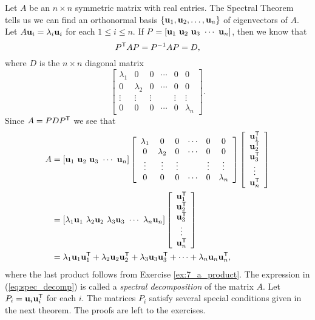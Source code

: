 \label{sec:spec_decomp_symm_mtx}

Let $A$ be an $n \times n$ symmetric matrix with real entries. The Spectral Theorem tells us we can find an orthonormal basis $\{\mathbf{u}_1, \mathbf{u}_2, \ldots, \mathbf{u}_n\}$ of eigenvectors of $A$. Let $A \mathbf{u}_i = \lambda_i \mathbf{u}_i$ for each $1 \leq i \leq n$. If $P = [ \vu_1 \  \vu_2 \  \vu_3 \  \cdots \ \vu_n]$, then we know that
\[P^{\mathsf{T}}AP = P^{-1}AP = D,\]
where $D$ is the $n \times n$ diagonal matrix
\[\left[ \begin{array}{cccccc} \lambda_1&0&0&\cdots&0&0 \\ 0&\lambda_2&0&\cdots&0&0 \\ \vdots&\vdots&\vdots&&\vdots&\vdots \\ 0&0&0&\cdots&0&\lambda_n \end{array} \right].\]
Since $A = PDP^{\mathsf{T}}$ we see that
\begin{align}
A &= [ \vu_1 \ \vu_2 \ \vu_3 \ \cdots \ \vu_n] \left[ \begin{array}{cccccc} \lambda_1&0&0&\cdots&0&0 \\ 0&\lambda_2&0&\cdots&0&0 \\ \vdots&\vdots&\vdots&&\vdots&\vdots \\ 0&0&0&\cdots&0&\lambda_n \end{array} \right] \left[ \begin{array}{c} \vu_1^{\tr} \\ \vu_2^{\tr} \\ \vu_3^{\tr} \\ \vdots \\ \vu_n^{\tr} \end{array} \right] \notag \\
	&= [ \lambda_1\vu_1 \ \lambda_2\vu_2 \ \lambda_3\vu_3 \ \cdots \ \lambda_n\vu_n] \left[ \begin{array}{c} \vu_1^{\tr} \\ \vu_2^{\tr} \\ \vu_3^{\tr} \\ \vdots \\ \vu_n^{\tr} \end{array} \right] \notag \\
	&= \lambda_1 \vu_1\vu_1^{\tr} + \lambda_2 \vu_2\vu_2^{\tr} + \lambda_3 \vu_3\vu_3^{\tr} + \cdots + \lambda_n \vu_n\vu_n^{\tr}, \label{eq:spec_decomp}
\end{align}
where the last product follows from Exercise \ref{ex:7_a_product}. The expression in (\ref{eq:spec_decomp}) is called a \emph{spectral decomposition} of the matrix $A$. Let $P_i = \mathbf{u}_i\mathbf{u}_i^{\mathsf{T}}$ for each $i$. The matrices $P_i$ satisfy several special conditions given in the next theorem. The proofs are left to the exercises. 

